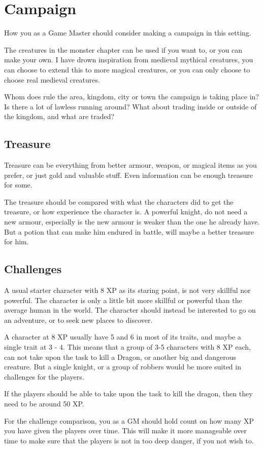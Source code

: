 \chapter{Campaign}
How you as a Game Master should consider making a campaign in this setting.

The creatures in the monster chapter can be used if you want to, or you can make your own.
I have drown inspiration from medieval mythical creatures, you can choose to extend this to more magical creatures, or you can only choose to choose real medieval creatures.

Whom does rule the area, kingdom, city or town the campaign is taking place in?
Is there a lot of lawless running around?
What about trading inside or outside of the kingdom, and what are traded?


\section{Treasure}
Treasure can be everything from better armour, weapon, or magical items as you prefer, or just gold and valuable stuff.
Even information can be enough treasure for some.

The treasure should be compared with what the characters did to get the treasure, or how experience the character is.
A powerful knight, do not need a new armour, especially is the new armour is weaker than the one he already have.
But a potion that can make him endured in battle, will maybe a better treasure for him.

\section{Challenges}
A usual starter character with 8 XP as its staring point, is not very skillful nor powerful.
The character is only a little bit more skillful or powerful than the average human in the world.
The character should instead be interested to go on an adventure, or to seek new places to discover.


A character at 8 XP usually have 5 and 6 in most of its traits, and maybe a single trait at 3 - 4.
This means that a group of 3-5 characters with 8 XP each, can not take upon the task to kill a Dragon, or another big and dangerous creature.
But a single knight, or a group of robbers would be more suited in challenges for the players.


If the players should be able to take upon the task to kill the dragon, then they need to be around 50 XP.

For the challenge comparison, you as a GM should hold count on how many XP you have given the players over time.
This will make it more manageable over time to make sure that the players is not in too deep danger, if you not wish to.

